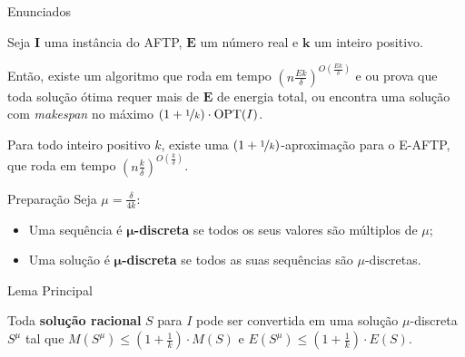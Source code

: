 \begin{frame}{Enunciados}
  \begin{thm}
    Seja $\mathbf{I}$ uma instância do AFTP, $\mathbf{E}$ um número real e $\mathbf{k}$ um inteiro positivo.
    \pause

    Então, existe um algoritmo que roda em tempo ${(n\frac{Ek}{\delta})^{O(\frac{Ek}{\delta})}}$ e \pause ou prova que toda solução ótima requer mais de $\mathbf{E}$ de energia total\pause, ou encontra uma solução com \emph{makespan} no máximo ${(1+\nicefrac{1}{k}) \cdot \text{OPT}(I)}$.
  \end{thm}

  \pause

  \begin{thm}
    Para todo inteiro positivo $k$, existe uma \mbox{$(1+\nicefrac{1}{k})$-aproximação} para o E-AFTP, que roda em tempo \mbox{$(n\frac{k}{\delta})^{O(\frac{k}{\delta})}$}.
  \end{thm}
\end{frame}

\begin{frame}{Preparação}
  \centering
  Seja $\mu=\frac{\delta}{4k}$:
  \pause
  \begin{itemize}[<+->]
    \item Uma sequência é \textbf{$\mathbf{\mu}$-discreta} se todos os seus valores são múltiplos de $\mu$;

    \item Uma solução é \textbf{$\mathbf{\mu}$-discreta} se todos as suas sequências são $\mu$-discretas.
  \end{itemize}
\end{frame}

\begin{frame}{Lema Principal}
  \begin{lemma}
    Toda \textbf{solução racional} $S$ para $I$ pode ser convertida em uma solução $\mu$-discreta $S^\mu$ tal que \pause $M(S^\mu) \leq \left(1 + \frac{1}{k} \right) \cdot M(S)$ e $E(S^\mu) \leq \left(1 + \frac{1}{k} \right) \cdot E(S)$.
  \end{lemma}
\end{frame}

